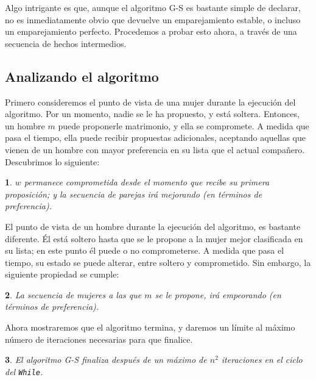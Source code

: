 \documentclass[a4paper, 12pt]{book}
\theoremstyle{dotless}
\newtheorem{theorem}{}%
\begin{document}
Algo intrigante es que, aunque el algoritmo G-S es bastante simple de declarar, no es inmediatamente obvio que devuelve un emparejamiento estable, o incluso un emparejamiento perfecto. Procedemos a probar esto ahora, a través de una secuencia de hechos intermedios.

\subsection*{Analizando el algoritmo}  

Primero consideremos el punto de vista de una mujer durante la ejecución del algoritmo. Por un momento, nadie se le ha propuesto, y está soltera. Entonces, un hombre $m$ puede proponerle matrimonio, y ella se compromete. A medida que pasa el tiempo, ella puede recibir propuestas adicionales, aceptando aquellas que vienen de un hombre con mayor preferencia en su lista que el actual compañero. Descubrimos lo siguiente:

\begin{theorem}
$w$ permanece comprometida desde el momento que recibe su primera proposición; y la secuencia de parejas irá mejorando (en términos de preferencia).
\end{theorem}

El punto de vista de un hombre durante la ejecución del algoritmo, es bastante diferente. Él está soltero hasta que se le propone a la mujer mejor clasificada en su lista; en este punto él puede o no comprometerse. A medida que pasa el tiempo, su estado se puede alterar, entre soltero y comprometido. Sin embargo, la siguiente propiedad se cumple:
\vspace{0.2cm}

\begin{theorem}
La secuencia de mujeres a las que $m$ se le propone, irá empeorando (en términos de preferencia).
\end{theorem}
 
\vspace{0.2cm}

Ahora mostraremos que el algoritmo termina, y daremos un límite al máximo número de iteraciones necesarias para que finalice.

\vspace{0.2cm}

\noindent\colorbox{mygray}{\parbox{\textwidth}{
\begin{theorem}
El algoritmo G-S finaliza después de un máximo de $n^2$ iteraciones en el ciclo del \texttt{While}.
\end{theorem}
}}
\end{document}
